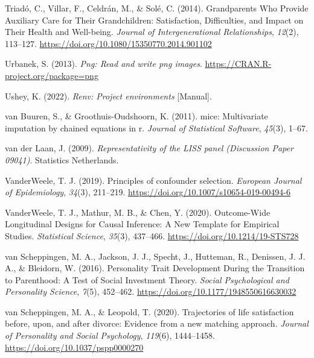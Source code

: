 \documentclass[
  english,
  man,floatsintext]{apa7}
\begin{document}
\leavevmode\hypertarget{ref-triadoGrandparentsWhoProvide2014}{}%
Triadó, C., Villar, F., Celdrán, M., \& Solé, C. (2014). Grandparents Who Provide Auxiliary Care for Their Grandchildren: Satisfaction, Difficulties, and Impact on Their Health and Well-being. \emph{Journal of Intergenerational Relationships}, \emph{12}(2), 113--127. \url{https://doi.org/10.1080/15350770.2014.901102}

\leavevmode\hypertarget{ref-R-png}{}%
Urbanek, S. (2013). \emph{Png: Read and write png images}. \url{https://CRAN.R-project.org/package=png}

\leavevmode\hypertarget{ref-R-renv}{}%
Ushey, K. (2022). \emph{Renv: Project environments} {[}Manual{]}.

\leavevmode\hypertarget{ref-mice2011}{}%
van Buuren, S., \& Groothuis-Oudshoorn, K. (2011). mice: Multivariate imputation by chained equations in r. \emph{Journal of Statistical Software}, \emph{45}(3), 1--67.

\leavevmode\hypertarget{ref-vanderlaanRepresentativityLISSPanel2009}{}%
van der Laan, J. (2009). \emph{Representativity of the LISS panel (Discussion Paper 09041)}. Statistics Netherlands.

\leavevmode\hypertarget{ref-vanderweelePrinciplesConfounderSelection2019}{}%
VanderWeele, T. J. (2019). Principles of confounder selection. \emph{European Journal of Epidemiology}, \emph{34}(3), 211--219. \url{https://doi.org/10.1007/s10654-019-00494-6}

\leavevmode\hypertarget{ref-vanderweeleOutcomeWideLongitudinalDesigns2020}{}%
VanderWeele, T. J., Mathur, M. B., \& Chen, Y. (2020). Outcome-Wide Longitudinal Designs for Causal Inference: A New Template for Empirical Studies. \emph{Statistical Science}, \emph{35}(3), 437--466. \url{https://doi.org/10.1214/19-STS728}

\leavevmode\hypertarget{ref-vanscheppingenPersonalityTraitDevelopment2016}{}%
van Scheppingen, M. A., Jackson, J. J., Specht, J., Hutteman, R., Denissen, J. J. A., \& Bleidorn, W. (2016). Personality Trait Development During the Transition to Parenthood: A Test of Social Investment Theory. \emph{Social Psychological and Personality Science}, \emph{7}(5), 452--462. \url{https://doi.org/10.1177/1948550616630032}

\leavevmode\hypertarget{ref-vanscheppingenTrajectoriesLifeSatisfaction2020}{}%
van Scheppingen, M. A., \& Leopold, T. (2020). Trajectories of life satisfaction before, upon, and after divorce: Evidence from a new matching approach. \emph{Journal of Personality and Social Psychology}, \emph{119}(6), 1444--1458. \url{https://doi.org/10.1037/pspp0000270}
\end{document}

